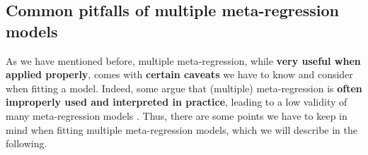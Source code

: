 \documentclass[]{book}
\begin{document}
\hypertarget{pitfalls}{%
\subsection{Common pitfalls of multiple meta-regression models}\label{pitfalls}}

As we have mentioned before, multiple meta-regression, while \textbf{very useful when applied properly}, comes with \textbf{certain caveats} we have to know and consider when fitting a model. Indeed, some argue that (multiple) meta-regression is \textbf{often improperly used and interpreted in practice}, leading to a low validity of many meta-regression models \citep{higgins2004controlling}. Thus, there are some points we have to keep in mind when fitting multiple meta-regression models, which we will describe in the following.
\end{document}
